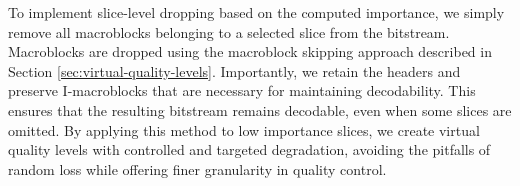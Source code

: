     To implement slice-level dropping based on the computed importance, we
    simply remove all macroblocks belonging to a selected slice from the
    bitstream. Macroblocks are dropped using the macroblock skipping approach
    described in Section \ref{sec:virtual-quality-levels}.  Importantly, we
    retain the headers and preserve I-macroblocks that are
    necessary for maintaining decodability. This ensures that the
    resulting bitstream remains decodable, even when some slices are omitted. By
    applying this method to low importance slices, we create
    virtual quality levels with controlled and targeted degradation, avoiding
    the pitfalls of random loss while offering finer granularity in quality
    control.
